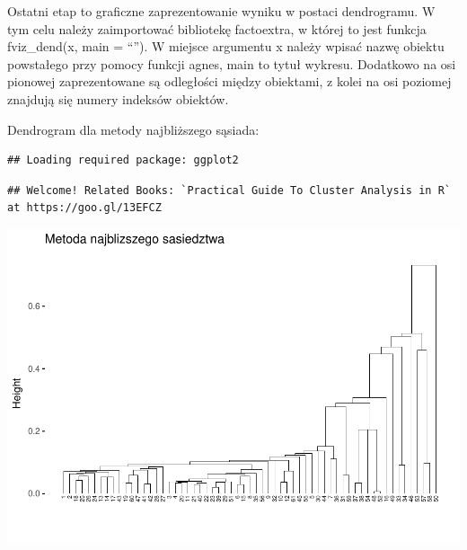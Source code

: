 \documentclass[12pt,a4paper]{report}
\begin{document}
{Ostatni etap to graficzne zaprezentowanie wyniku w postaci dendrogramu.
W tym celu należy zaimportować bibliotekę factoextra, w której to jest
funkcja fviz\_dend(x, main = ``''). W miejsce argumentu x należy wpisać
nazwę obiektu powstałego przy pomocy funkcji agnes, main to tytuł
wykresu. Dodatkowo na osi pionowej zaprezentowane są odległości między
obiektami, z kolei na osi poziomej znajdują się numery indeksów
obiektów.

Dendrogram dla metody najbliższego sąsiada:

\begin{Shaded}
\begin{Highlighting}[]
\end{Highlighting}
\end{Shaded}

\begin{verbatim}
## Loading required package: ggplot2
\end{verbatim}

\begin{verbatim}
## Welcome! Related Books: `Practical Guide To Cluster Analysis in R` at https://goo.gl/13EFCZ
\end{verbatim}

\begin{Shaded}
\begin{Highlighting}[]
\NormalTok{, }\NormalTok{, } \NormalTok{)}
\end{Highlighting}
\end{Shaded}

\includegraphics{Metoda_nieliniowa_duzy_files/figure-latex/unnamed-chunk-9-1.pdf}

}
\end{document}
